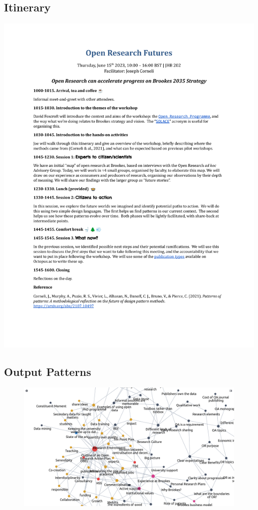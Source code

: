 \documentclass[acmlarge,timestamp]{acmart}
\begin{document}
\clearpage

\subsection{Itinerary}

\begin{mdframed}[backgroundcolor=blue!50,linecolor=blue!50]
  \noindent\includegraphics[width=\textwidth,trim={1cm 5.5cm 1cm 4.5cm},clip=true]{brookes}
\end{mdframed}

\clearpage

\subsection{Output Patterns}

\begin{figure}
  \includegraphics[width=\textwidth]{org-roam-screenshot.png}
  \caption{\label{Org-Roam-Screenshot}}
\end{figure}
\end{document}
